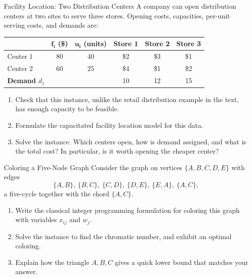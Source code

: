 \begin{ex}{Facility Location: Two Distribution Centers}{}
\label{ex:facility-small}
 A company can open distribution centers at two sites to serve three stores.  Opening costs, capacities, per-unit serving costs, and demands are:

\begin{center}
\begin{tabular}{lcc|ccc}
\toprule
 & \(\mathbf{f_i}\) (\$) & \(\mathbf{u_i}\) (units) & Store 1 & Store 2 & Store 3 \\
\midrule
Center 1 & 80 & 40 & \$2 & \$3 & \$1 \\
Center 2 & 60 & 25 & \$4 & \$1 & \$2 \\
\midrule
\textbf{Demand \(d_j\)} & & & 10 & 12 & 15 \\
\bottomrule
\end{tabular}
\par{}\label{tab:integerProgrammingFormulations-book1-tab06}%

\end{center}

\begin{enumerate}
\item Check that this instance, unlike the retail distribution example in the text, has enough capacity to be feasible.
\item Formulate the capacitated facility location model for this data.
\item Solve the instance.  Which centers open, how is demand assigned, and what is the total cost?  In particular, is it worth opening the cheaper center?
\end{enumerate}
\exrefs{\S\ref{sec:facility-location}}
\end{ex}

\begin{ex}{Coloring a Five-Node Graph}{}
\label{ex:graph-coloring-5}
 Consider the graph on vertices $\{A, B, C, D, E\}$ with edges
\[
\{A,B\},\ \{B,C\},\ \{C,D\},\ \{D,E\},\ \{E,A\},\ \{A,C\},
\]
a five-cycle together with the chord $\{A,C\}$.
\begin{enumerate}
\item Write the classical integer programming formulation for coloring this graph with variables $x_{ij}$ and $w_j$.
\item Solve the instance to find the chromatic number, and exhibit an optimal coloring.
\item Explain how the triangle $A, B, C$ gives a quick lower bound that matches your answer.
\end{enumerate}
\exrefs{\S\ref{sec:graph-coloring}}
\end{ex}

